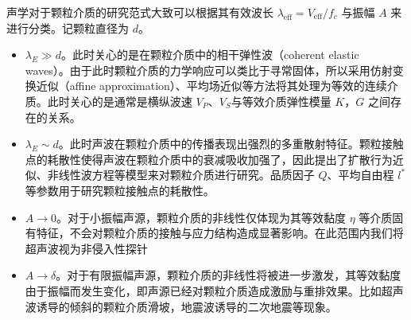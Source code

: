 声学对于颗粒介质的研究范式大致可以根据其有效波长 $\lambda_{\text{eff}} = V_{\text{eff}}/f_{c}$ 与振幅 $A$ 来进行分类。记颗粒直径为 $d$。

\begin{itemize}
  \item $\lambda_{E}\gg d$。此时关心的是在颗粒介质中的相干弹性波（coherent elastic waves）。由于此时颗粒介质的力学响应可以类比于寻常固体，所以采用仿射变换近似（affine approximation）、平均场近似等方法将其处理为等效的连续介质。此时关心的是通常是横纵波速 $V_{P}$、$V_{S}$与等效介质弹性模量 $K$，$G$ 之间存在的关系。
  \item $\lambda_{E}\sim d$。此时声波在颗粒介质中的传播表现出强烈的多重散射特征。颗粒接触点的耗散性使得声波在颗粒介质中的衰减吸收加强了，因此提出了扩散行为近似\cite{PhysRevLett.93.154303}、非线性波方程\cite{Transitional,hamilton_nonlinear_1998}等模型来对颗粒介质进行研究。品质因子 $Q$、平均自由程 $l^{*}$ 等参数用于研究颗粒接触点的耗散性。
  \item $A\rightarrow 0$。对于小振幅声源，颗粒介质的非线性仅体现为其等效黏度 $\eta$ 等介质固有特征，不会对颗粒介质的接触与应力结构造成显著影响。在此范围内我们将超声波视为非侵入性探针
  \item $A\rightarrow \delta$。对于有限振幅声源，颗粒介质的非线性将被进一步激发，其等效黏度由于振幅而发生变化，即声源已经对颗粒介质造成激励与重排效果。比如超声波诱导的倾斜的颗粒介质滑坡\cite{PhysRevE.102.042901}，地震波诱导的二次地震\cite{johnson_nonlinear_2005}等现象。
\end{itemize}

